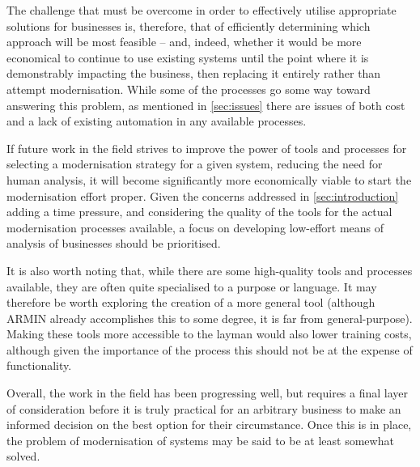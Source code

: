 \documentclass[12pt,journal,compsoc]{IEEEtran}
\begin{document}
The challenge that must be overcome in order to effectively utilise appropriate solutions for businesses is, therefore, that of efficiently determining which approach will be most feasible -- and, indeed, whether it would be more economical to continue to use existing systems until the point where it is demonstrably impacting the business, then replacing it entirely rather than attempt modernisation. While some of the processes go some way toward answering this problem, as mentioned in \autoref{sec:issues} there are issues of both cost and a lack of existing automation in any available processes.

If future work in the field strives to improve the power of tools and processes for selecting a modernisation strategy for a given system, reducing the need for human analysis, it will become significantly more economically viable to start the modernisation effort proper. Given the concerns addressed in \autoref{sec:introduction} adding a time pressure, and considering the quality of the tools for the actual modernisation processes available, a focus on developing low-effort means of analysis of businesses should be prioritised.

It is also worth noting that, while there are some high-quality tools and processes available, they are often quite specialised to a purpose or language. It may therefore be worth exploring the creation of a more general tool (although ARMIN \cite{O'Brien2005} already accomplishes this to some degree, it is far from general-purpose). Making these tools more accessible to the layman would also lower training costs, although given the importance of the process this should not be at the expense of functionality.

Overall, the work in the field has been progressing well, but requires a final layer of consideration before it is truly practical for an arbitrary business to make an informed decision on the best option for their circumstance. Once this is in place, the problem of modernisation of systems may be said to be at least somewhat solved.

\appendices

\end{document}
